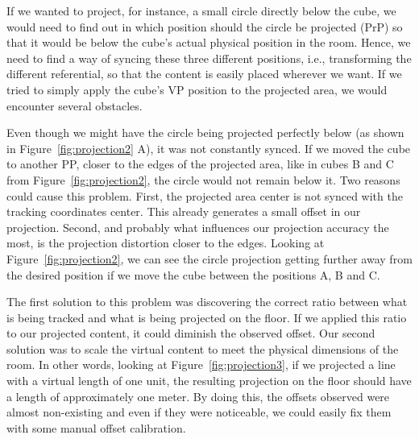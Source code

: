 If we wanted to project, for instance, a small circle directly below the cube, we would need to find out in which position should the circle be projected (\ac{PrP}) so that it would be below the cube's actual physical position in the room. Hence, we need to find a way of syncing these three different positions, i.e., transforming the different referential, so that the content is easily placed wherever we want. If we tried to simply apply the cube's \ac{VP} position to the projected area, we would encounter several obstacles.

Even though we might have the circle being projected perfectly below (as shown in Figure~\ref{fig:projection2} A), it was not constantly synced.
If we moved the cube to another \ac{PP}, closer to the edges of the projected area, like in cubes B and C from Figure~\ref{fig:projection2}, the circle would not remain below it. 
Two reasons could cause this problem. First, the projected area center is not synced with the tracking coordinates center. 
This already generates a small offset in our projection. 
Second, and probably what influences our projection accuracy the most, is the projection distortion closer to the edges.
Looking at Figure~\ref{fig:projection2}, we can see the circle projection getting further away from the desired position if we move the cube between the positions A, B and C.

The first solution to this problem was discovering the correct ratio between what is being tracked and what is being projected on the floor. 
If we applied this ratio to our projected content, it could diminish the observed offset. 
Our second solution was to scale the virtual content to meet the physical dimensions of the room. 
In other words, looking at Figure~\ref{fig:projection3}, if we projected a line with a virtual length of one unit, the resulting projection on the floor should have a length of approximately one meter.
By doing this, the offsets observed were almost non-existing and even if they were noticeable, we could easily fix them with some manual offset calibration.

